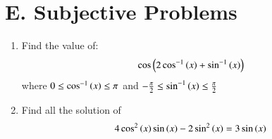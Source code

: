 \documentclass[journal,12pt,onecolumn,article]{IEEEtran}
\theoremstyle{remark}
\begin{document}
\section*{E. Subjective Problems}
\begin{enumerate}
\item Find the value of: 
\begin{align*}
\cos \left(2\cos ^{-1}\left(x\right)+\sin ^{-1}\left(x\right)\right) 
\end{align*}
where $0\le \cos ^{-1}\left(x\right) \le \pi$ and $-\frac{\pi}{2}\le \sin ^{-1}\left(x\right) \le\frac{\pi}{2}$
\hfill {}
\item Find all the solution of
\begin{align*}
4\cos ^2\left(x\right)\sin \left(x\right)-2\sin ^2 \left(x\right) = 3\sin \left(x\right)
\end{align*}
\hfill {}
\end{enumerate}
\end{document}
